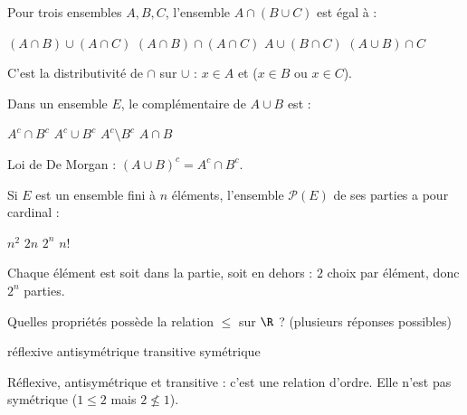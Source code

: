 
\begin{question}
Pour trois ensembles $A,B,C$, l'ensemble $A\cap(B\cup C)$ est égal à :
\begin{reponses}
  \bonne $(A\cap B)\cup(A\cap C)$
  \mauvaise $(A\cap B)\cap(A\cap C)$
  \mauvaise $A\cup(B\cap C)$
  \mauvaise $(A\cup B)\cap C$
\end{reponses}
\begin{explication}
C'est la distributivité de $\cap$ sur $\cup$ : $x\in A$ et ($x\in B$ ou $x\in C$).
\end{explication}
\end{question}

\begin{question}
Dans un ensemble $E$, le complémentaire de $A\cup B$ est :
\begin{reponses}
  \bonne $A^{c}\cap B^{c}$
  \mauvaise $A^{c}\cup B^{c}$
  \mauvaise $A^{c}\setminus B^{c}$
  \mauvaise $A\cap B$
\end{reponses}
\begin{explication}
Loi de De Morgan : $(A\cup B)^c=A^c\cap B^c$.
\end{explication}
\end{question}

\begin{question}
Si $E$ est un ensemble fini à $n$ éléments, l'ensemble $\mathcal{P}(E)$ de ses parties a pour cardinal :
\begin{reponses}
  \mauvaise $n^2$
  \mauvaise $2n$
  \bonne $2^n$
  \mauvaise $n!$
\end{reponses}
\begin{explication}
Chaque élément est soit dans la partie, soit en dehors : $2$ choix par élément, donc $2^n$ parties.
\end{explication}
\end{question}

\begin{question}
Quelles propriétés possède la relation $\le$ sur $\R$ ? (plusieurs réponses possibles)
\begin{reponses}
  \bonne réflexive
  \bonne antisymétrique
  \bonne transitive
  \mauvaise symétrique
\end{reponses}
\begin{explication}
Réflexive, antisymétrique et transitive : c'est une relation d'ordre. Elle n'est pas symétrique ($1\le2$ mais $2\not\le1$).
\end{explication}
\end{question}

